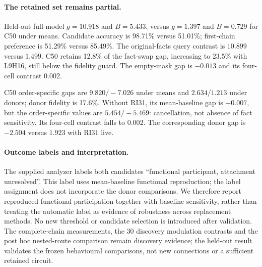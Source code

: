 \paragraph{The retained set remains partial.}
Held-out full-model $g=10.918$ and $B=5.433$, versus $g=1.397$ and $B=0.729$
for C50 under means. Candidate accuracy is 98.71\% versus 51.01\%; first-chain
preference is 51.29\% versus 85.49\%. The original-facts query contrast is
$10.899$ versus $1.499$. C50 retains 12.8\% of the fact-swap gap, increasing to
23.5\% with L9H16, still below the fidelity guard. The empty-mask gap is
$-0.013$ and its four-cell contrast $0.002$.

C50 order-specific gaps are $9.820/-7.026$ under means and $2.634/1.213$
under donors; donor fidelity is 17.6\%. Without RI31, its mean-baseline gap
is $-0.007$, but the order-specific values are $5.454/-5.469$: cancellation,
not absence of fact sensitivity. Its four-cell contrast falls to $0.002$.
The corresponding donor gap is $-2.504$ versus $1.923$ with RI31 live.

\paragraph{Outcome labels and interpretation.}
The supplied analyzer labels both candidates ``functional participant,
attachment unresolved''. This label uses mean-baseline functional reproduction;
the label assignment does not incorporate the donor comparisons. We therefore
report reproduced functional participation together with baseline sensitivity,
rather than treating the automatic label as evidence of robustness across
replacement methods. No new threshold or candidate selection is introduced
after validation. The complete-chain measurements, the 30 discovery modulation
contrasts and the post hoc nested-route comparison remain discovery evidence;
the held-out result validates the frozen behavioural comparisons, not new
connections or a sufficient retained circuit.
